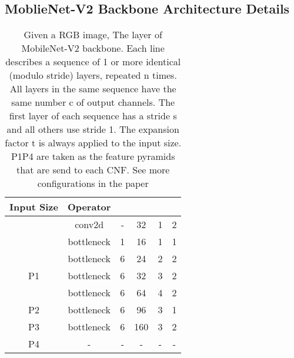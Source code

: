 \documentclass[journal]{IEEEtran}
\begin{document}
\subsection{MoblieNet-V2 Backbone Architecture Details}
\begin{table}[h]
\label{mobilenetv2_backbone}
	\caption{Given a  RGB image, The layer of MobileNet-V2 backbone. Each line describes a sequence
		of 1 or more identical (modulo stride) layers, repeated
		n times. All layers in the same sequence have the same
		number c of output channels. The first layer of each
		sequence has a stride s and all others use stride 1. The expansion
		factor t is always applied to the input size. P1P4 are taken as the feature pyramids that are send to each CNF. See more configurations in the paper \cite{Sandler2018MobileNetV2IR}}
	\centering
\begin{tabular}{c|c|c|c|c|c}
		\toprule[0.2em]
		Input Size & Operator                           & &  &  & \\
		\toprule[0.2em]
		 &    conv2d                  					&  - &  								32 & 1 & 2\\
		 						&    bottleneck    		&  1 & 16   &1 & 1\\
		 							&   bottleneck    		 		&  6 & 24   &2 &2\\
		  P1&   bottleneck     		   &  6 & 32   & 3    & 2\\
		 							& bottleneck       			 &  6 & 64   &  4 &2 \\
		  P2&    bottleneck 				&  6 & 96   &3 & 1 \\
		  P3&    bottleneck    		  &  6 & 160  &3  & 2 \\
		  P4&    -        &  - & -  & - & - \\

		\toprule[0.2em]
	\end{tabular}
\end{table}
\end{document}
